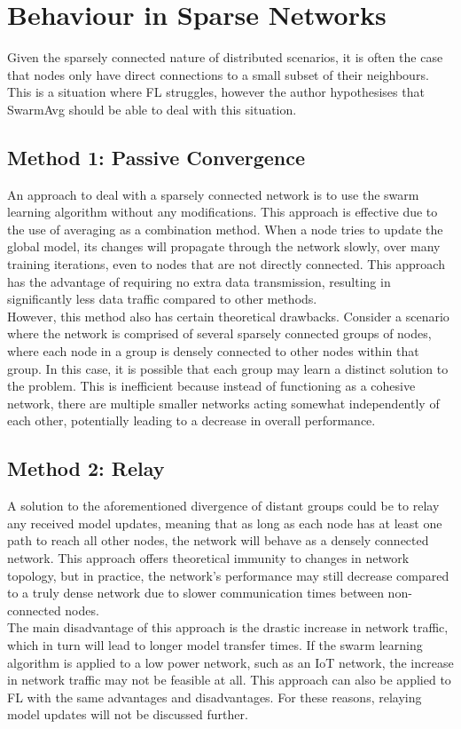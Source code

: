 \section{Behaviour in Sparse Networks}
Given the sparsely connected nature of distributed scenarios, it is often the case that nodes only have direct connections to a small subset of their neighbours. This is a situation where FL struggles, however the author hypothesises that SwarmAvg should be able to deal with this situation.

\subsection{Method 1: Passive Convergence}
An approach to deal with a sparsely connected network is to use the swarm learning algorithm without any modifications. This approach is effective due to the use of averaging as a combination method. When a node tries to update the global model, its changes will propagate through the network slowly, over many training iterations, even to nodes that are not directly connected. This approach has the advantage of requiring no extra data transmission, resulting in significantly less data traffic compared to other methods. \\

However, this method also has certain theoretical drawbacks. Consider a scenario where the network is comprised of several sparsely connected groups of nodes, where each node in a group is densely connected to other nodes within that group. In this case, it is possible that each group may learn a distinct solution to the problem. This is inefficient because instead of functioning as a cohesive network, there are multiple smaller networks acting somewhat independently of each other, potentially leading to a decrease in overall performance.


\subsection{Method 2: Relay} \label{relay}
A solution to the aforementioned divergence of distant groups could be to relay any received model updates, meaning that as long as each node has at least one path to reach all other nodes, the network will behave as a densely connected network. This approach offers theoretical immunity to changes in network topology, but in practice, the network's performance may still decrease compared to a truly dense network due to slower communication times between non-connected nodes. \\

The main disadvantage of this approach is the drastic increase in network traffic, which in turn will lead to longer model transfer times. If the swarm learning algorithm is applied to a low power network, such as an IoT network, the increase in network traffic may not be feasible at all. This approach can also be applied to FL with the same advantages and disadvantages. For these reasons, relaying model updates will not be discussed further.
